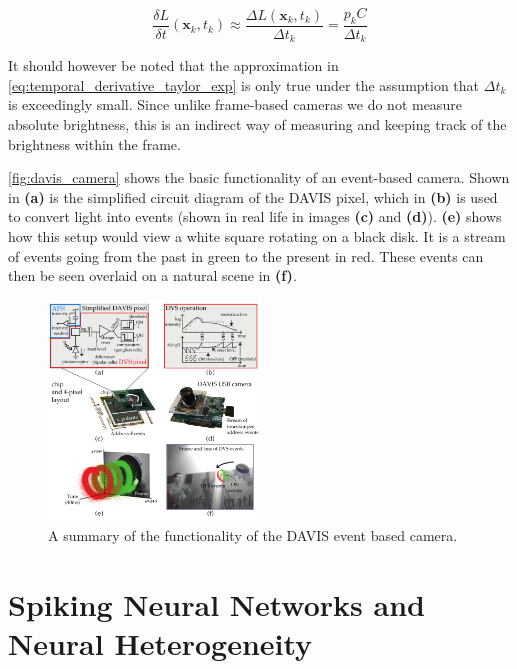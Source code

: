 \begin{equation}
      \frac{\delta L}{\delta t}(\boldsymbol{\mathbf{x}}_k, t_k) \approx \frac{\Delta L(\boldsymbol{\mathbf{x}}_k, t_k)}{\Delta t_k} = \frac{p_k C}{\Delta t_k}
      \label{eq:temporal_derivative}
\end{equation}

It should however be noted that the approximation in \autoref{eq:temporal_derivative_taylor_exp} is only true under the assumption that $ \Delta t_k $ is exceedingly small. Since unlike frame-based cameras we do not measure absolute brightness, this is an indirect way of measuring and keeping track of the brightness within the frame.

\autoref{fig:davis_camera} shows the basic functionality of an event-based camera. Shown in \textbf{(a)} is the simplified circuit diagram of the DAVIS pixel, which in \textbf{(b)} is used to convert light into events (shown in real life in images \textbf{(c)} and \textbf{(d)}). \textbf{(e)} shows how this setup would view a white square rotating on a black disk. It is a stream of events going from the past in green to the present in red. These events can then be seen overlaid on a natural scene in \textbf{(f)}.

\begin{figure}[htb]
      \centering
      \includegraphics[width=0.5\textwidth]{background/images/davis_camera.png}
      \caption{A summary of the functionality of the DAVIS event based camera\cite{EventBasedVisionASurvery}.}
      \label{fig:davis_camera}
\end{figure}

\section{Spiking Neural Networks and Neural Heterogeneity}

